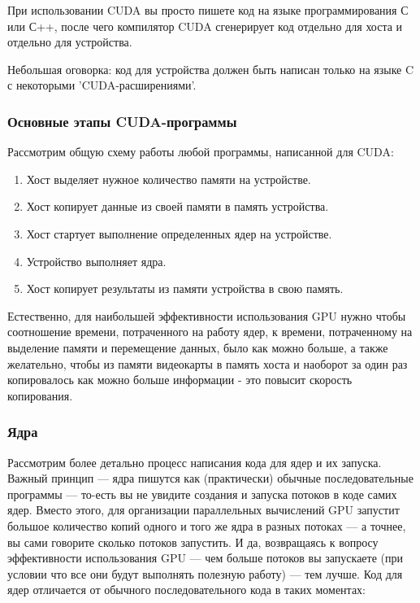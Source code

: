 \documentclass[12pt,a4paper]{scrartcl}
\begin{document}
При использовании CUDA вы просто пишете код на языке программирования С или С++, после чего компилятор CUDA сгенерирует код отдельно для хоста и отдельно для устройства.

Небольшая оговорка: код для устройства должен быть написан только на языке C с некоторыми 'CUDA-расширениями'.

\subsubsection{Основные этапы CUDA-программы}

Рассмотрим общую схему работы любой программы, написанной для CUDA:

\begin{enumerate}
	\item Хост выделяет нужное количество памяти на устройстве.
	\item Хост копирует данные из своей памяти в память устройства.
	\item Хост стартует выполнение определенных ядер на устройстве.
	\item Устройство выполняет ядра.
	\item Хост копирует результаты из памяти устройства в свою память.
\end{enumerate}

Естественно, для наибольшей эффективности использования GPU нужно чтобы соотношение времени, потраченного на работу ядер, к времени, потраченному на выделение памяти и перемещение данных, было как можно больше, а также желательно, чтобы из памяти видеокарты в память хоста и наоборот за один раз копировалось как можно больше информации - это повысит скорость копирования.

\subsubsection{Ядра}

Рассмотрим более детально процесс написания кода для ядер и их запуска. Важный принцип — ядра пишутся как (практически) обычные последовательные программы — то-есть вы не увидите создания и запуска потоков в коде самих ядер. Вместо этого, для организации параллельных вычислений GPU запустит большое количество копий одного и того же ядра в разных потоках — а точнее, вы сами говорите сколько потоков запустить. И да, возвращаясь к вопросу эффективности использования GPU — чем больше потоков вы запускаете (при условии что все они будут выполнять полезную работу) — тем лучше.
Код для ядер отличается от обычного последовательного кода в таких моментах:
\end{document}
